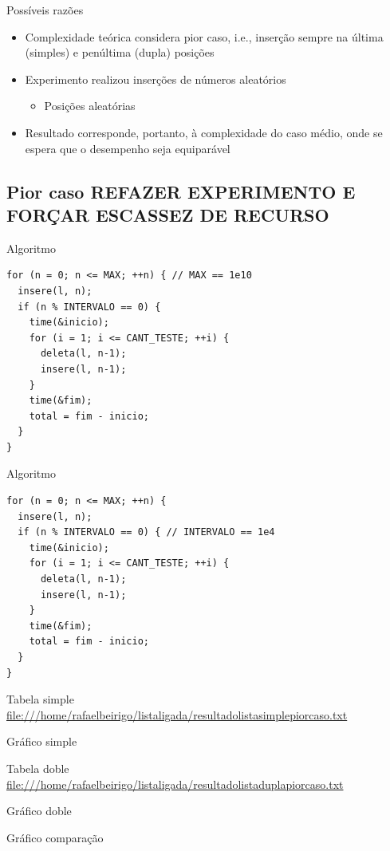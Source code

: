 \documentclass[bigger]{beamer}
\begin{document}
\begin{frame}[label=sec-3-1-8]{Possíveis razões}
\begin{itemize}
\item Complexidade teórica considera \alert{pior} caso, i.e., inserção sempre na
última (simples) e penúltima (dupla) posições
\item Experimento realizou inserções de números aleatórios
\begin{itemize}
\item Posições aleatórias
\end{itemize}
\item Resultado corresponde, portanto, à complexidade do \alert{caso médio},
onde se espera que o desempenho seja equiparável
\end{itemize}
\end{frame}
\subsection{Pior caso REFAZER EXPERIMENTO E FORÇAR ESCASSEZ DE RECURSO}
\label{sec-3-2}
\begin{frame}[fragile,label=sec-3-2-1]{Algoritmo}
 \begin{verbatim}
for (n = 0; n <= MAX; ++n) { // MAX == 1e10
  insere(l, n);
  if (n % INTERVALO == 0) {
    time(&inicio);
    for (i = 1; i <= CANT_TESTE; ++i) {
      deleta(l, n-1);
      insere(l, n-1);
    }
    time(&fim);
    total = fim - inicio;
  }
}
\end{verbatim}
\end{frame}
\begin{frame}[fragile,label=sec-3-2-2]{Algoritmo}
 \begin{verbatim}
for (n = 0; n <= MAX; ++n) {
  insere(l, n);
  if (n % INTERVALO == 0) { // INTERVALO == 1e4
    time(&inicio);
    for (i = 1; i <= CANT_TESTE; ++i) {
      deleta(l, n-1);
      insere(l, n-1);
    }
    time(&fim);
    total = fim - inicio;
  }
}
\end{verbatim}
\end{frame}
\begin{frame}[label=sec-3-2-3]{Tabela simple}
\url{file:///home/rafaelbeirigo/listaligada/resultadolistasimplepiorcaso.txt}
\end{frame}
\begin{frame}[label=sec-3-2-4]{Gráfico simple}
\end{frame}
\begin{frame}[label=sec-3-2-5]{Tabela doble}
\url{file:///home/rafaelbeirigo/listaligada/resultadolistaduplapiorcaso.txt}
\end{frame}
\begin{frame}[label=sec-3-2-6]{Gráfico doble}
\end{frame}
\begin{frame}[label=sec-3-2-7]{Gráfico comparação}
\end{frame}
\end{document}

